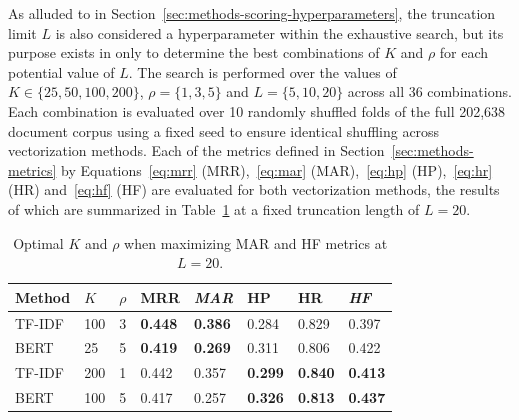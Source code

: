 \documentclass[11pt]{article}
\theoremstyle{plain}
\theoremstyle{definition}
\begin{document}
As alluded to in Section~\ref{sec:methods-scoring-hyperparameters}, the truncation limit $L$ is also considered a hyperparameter within the exhaustive search, but its purpose exists in only to determine the best combinations of $K$ and $\rho$ for each potential value of $L$. The search is performed over the values of $K \in \{ 25, 50, 100, 200 \}$, $\rho=\{1,3,5\}$ and $L=\{5,10,20\}$ across all 36 combinations. Each combination is evaluated over 10 randomly shuffled folds of the full 202,638 document corpus using a fixed seed to ensure identical shuffling across vectorization methods. Each of the metrics defined in Section~\ref{sec:methods-metrics} by Equations~\ref{eq:mrr} (MRR),~\ref{eq:mar} (MAR),~\ref{eq:hp} (HP),~\ref{eq:hr} (HR) and~\ref{eq:hf} (HF) are evaluated for both vectorization methods, the results of which are summarized in Table~\ref{tab:both_optimal_sel} at a fixed truncation length of $L=20$.
\begin{table}
    \centering
    \begin{tabular}{| m{4em} | m{2em} | m{2em} | m{3em} | m{3em} | m{3em} | m{3em} | m{3em} |}
        \hline
        Method & $K$ & $\rho$ & MRR            & \textit{MAR}   & HP             & HR             & \textit{HF}    \\
        \hline
        \hline
        TF-IDF & 100 & 3      & \textbf{0.448} & \textbf{0.386} & 0.284          & 0.829          & 0.397          \\
        \hline
        BERT   & 25  & 5      & \textbf{0.419} & \textbf{0.269} & 0.311          & 0.806          & 0.422          \\
        \hline
        \hline
        TF-IDF & 200 & 1      & 0.442          & 0.357          & \textbf{0.299} & \textbf{0.840} & \textbf{0.413} \\
        \hline
        BERT   & 100 & 5      & 0.417          & 0.257          & \textbf{0.326} & \textbf{0.813} & \textbf{0.437} \\
        \hline
    \end{tabular}
    \caption{Optimal $K$ and $\rho$ when maximizing MAR and HF metrics at $L=20$.}\label{tab:both_optimal_sel}
\end{table}
\end{document}
